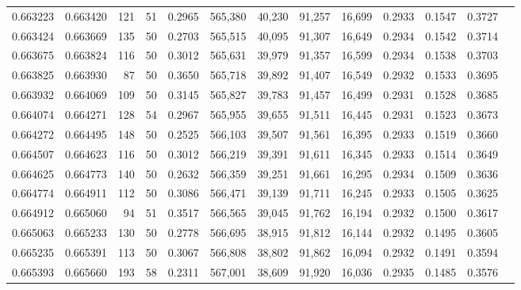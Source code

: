 \begin{tabular}{rrrrrrrrrrrrr}
0.663223 & 0.663420 &   121 &  51 &                                     0.2965 & 565,380 &  40,230 &  91,257 &  16,699 & 0.2933 & 0.1547 & 0.3727 \\
0.663424 & 0.663669 &   135 &  50 &                                     0.2703 & 565,515 &  40,095 &  91,307 &  16,649 & 0.2934 & 0.1542 & 0.3714 \\
0.663675 & 0.663824 &   116 &  50 &                                     0.3012 & 565,631 &  39,979 &  91,357 &  16,599 & 0.2934 & 0.1538 & 0.3703 \\
0.663825 & 0.663930 &    87 &  50 &                                     0.3650 & 565,718 &  39,892 &  91,407 &  16,549 & 0.2932 & 0.1533 & 0.3695 \\
0.663932 & 0.664069 &   109 &  50 &                                     0.3145 & 565,827 &  39,783 &  91,457 &  16,499 & 0.2931 & 0.1528 & 0.3685 \\
0.664074 & 0.664271 &   128 &  54 &                                     0.2967 & 565,955 &  39,655 &  91,511 &  16,445 & 0.2931 & 0.1523 & 0.3673 \\
0.664272 & 0.664495 &   148 &  50 &                                     0.2525 & 566,103 &  39,507 &  91,561 &  16,395 & 0.2933 & 0.1519 & 0.3660 \\
0.664507 & 0.664623 &   116 &  50 &                                     0.3012 & 566,219 &  39,391 &  91,611 &  16,345 & 0.2933 & 0.1514 & 0.3649 \\
0.664625 & 0.664773 &   140 &  50 &                                     0.2632 & 566,359 &  39,251 &  91,661 &  16,295 & 0.2934 & 0.1509 & 0.3636 \\
0.664774 & 0.664911 &   112 &  50 &                                     0.3086 & 566,471 &  39,139 &  91,711 &  16,245 & 0.2933 & 0.1505 & 0.3625 \\
0.664912 & 0.665060 &    94 &  51 &                                     0.3517 & 566,565 &  39,045 &  91,762 &  16,194 & 0.2932 & 0.1500 & 0.3617 \\
0.665063 & 0.665233 &   130 &  50 &                                     0.2778 & 566,695 &  38,915 &  91,812 &  16,144 & 0.2932 & 0.1495 & 0.3605 \\
0.665235 & 0.665391 &   113 &  50 &                                     0.3067 & 566,808 &  38,802 &  91,862 &  16,094 & 0.2932 & 0.1491 & 0.3594 \\
0.665393 & 0.665660 &   193 &  58 &                                     0.2311 & 567,001 &  38,609 &  91,920 &  16,036 & 0.2935 & 0.1485 & 0.3576 \\

\end{tabular}
